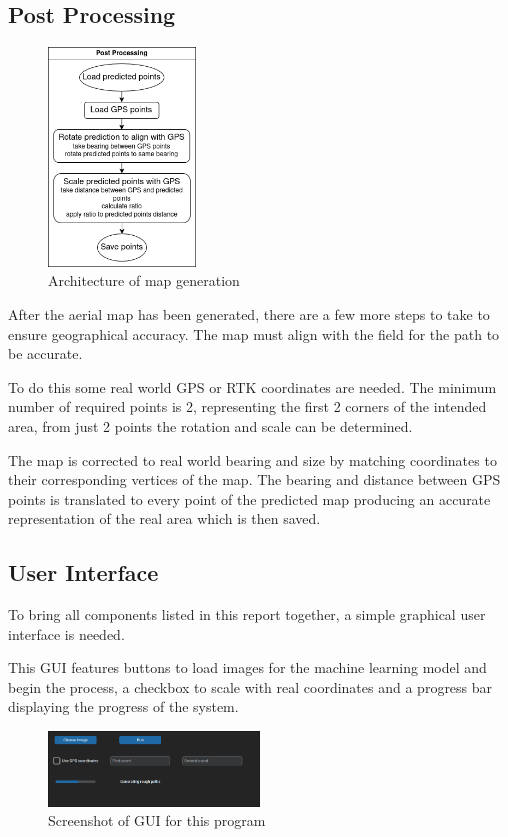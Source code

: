 \documentclass[final]{cmpreport_02}
\begin{document}
\subsection{Post Processing}

\begin{figure}[H]
	\centering
	\includegraphics[width=0.35\textwidth]{./images/postProcessing.drawio.png}
	\caption{Architecture of map generation}
	\label{PPr:arch}
\end{figure}

After the aerial map has been generated, there are a few more steps to take to ensure geographical accuracy.
The map must align with the field for the path to be accurate.

To do this some real world GPS or RTK coordinates are needed.
The minimum number of required points is 2, representing the first 2 corners of the intended area, from just 2 points the rotation and scale can be determined.

The map is corrected to real world bearing and size by matching coordinates to their corresponding vertices of the map.
The bearing and distance between GPS points is translated to every point of the predicted map producing an accurate representation of the real area which is then saved.


\subsection{User Interface}
To bring all components listed in this report together, a simple graphical user interface is needed.

This GUI features buttons to load images for the machine learning model and begin the process, a checkbox to scale with real coordinates and a progress bar displaying the progress of the system.


\begin{figure}[h!]
	\centering
	\includegraphics[width=0.5\textwidth]{./images/GUI.png}
	\caption{Screenshot of GUI for this program}
	\label{GUI}
\end{figure}
\end{document}

